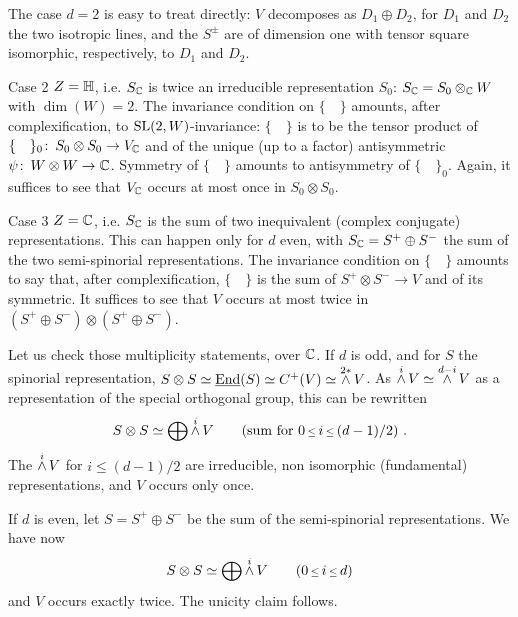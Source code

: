 The case $d=2$ is easy to treat directly:
$V$ decomposes as $D_1\oplus D_2$, for $D_1$ and $D_2$
the two isotropic lines, and the $S^\pm$ are of
dimension one with tensor square isomorphic,
respectively, to $D_1$ and $D_2$.

\subhead
{\rm Case 2}
\endsubhead
$Z={\Bbb H}$, i.e. $S_{\Bbb C}$ is twice an irreducible
representation $S_0$: $S_{\Bbb C}=S_0\otimes_{\Bbb C} W$ with
$\dim(W)=2$.
The invariance condition on $\{\quad\}$ amounts, after
complexification, to $\text{\rm SL}(2,W)$-invariance:
$\{\quad\}$ is to be the tensor product of
$\{\quad\}_0\colon\,S_0\otimes S_0\to V_{\Bbb C}$ and of the
unique (up to a factor) antisymmetric $\psi\colon\,
W\otimes W\to{\Bbb C}$.
Symmetry of $\{\quad\}$ amounts to antisymmetry of
$\{\quad\}_0$.
Again, it suffices to see that $V_{\Bbb C}$ occurs at most once
in $S_0\otimes S_0$.

\subhead
{\rm Case 3}
\endsubhead
$Z={\Bbb C}$, i.e. $S_{\Bbb C}$ is the sum of two inequivalent
(complex conjugate) representations.
This can happen only for $d$ even, with
$S_{\Bbb C}=S^+\oplus S^-$ the sum of the two
semi-spinorial representations.
The invariance condition on $\{\quad\}$ amounts to
say that, after complexification, $\{\quad\}$ is the
sum of $S^+\otimes S^-\to V$ and of its symmetric.
It suffices to see that $V$ occurs at most twice
in$(S^+\oplus S^-)\otimes(S^+\oplus S^-)$.

Let us check those multiplicity statements, over
${\Bbb C}$.
If $d$ is odd, and for $S$ the spinorial
representation, $S\otimes S\simeq
\underline{\End}(S)\simeq C^+(V)\simeq \wedgeop^{2*} V$.
As $\wedgeop^{i} V\simeq \wedgeop^{d-i} V$ as a
representation of the special orthogonal group, this can be
rewritten
$$
S\otimes S\simeq \bigoplus \wedgeop^{i} V
\qquad\text{(sum for $0\Le i\Le (d-1)/2$) }.
$$
The $\wedgeop^{i} V$ for $i\le (d-1)/2$ are
irreducible, non isomorphic (fundamental)
representations, and $V$ occurs only once.

If $d$ is even, let $S=S^+\oplus S^-$ be the sum of the
semi-spinorial representations.
We have now
$$
S\otimes S\simeq \bigoplus \wedgeop^{i} V\qquad
(0\Le i\Le d)
$$
and $V$ occurs exactly twice.
The unicity claim follows.


\enddocument



